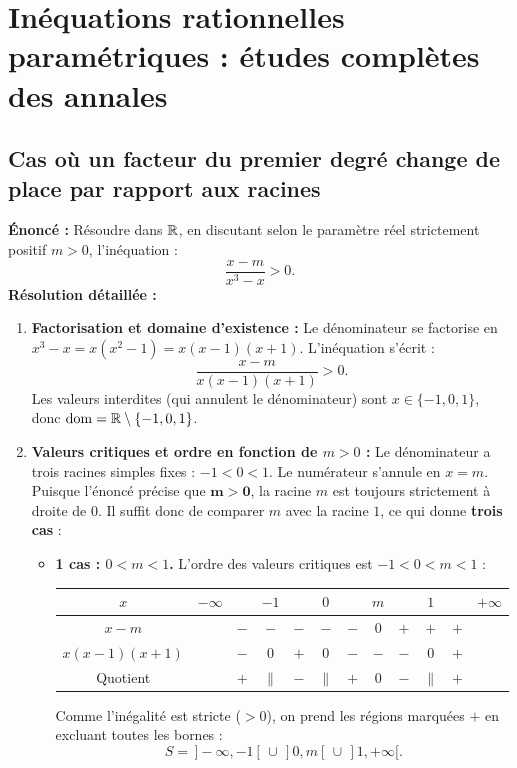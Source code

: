 \section{Inéquations rationnelles paramétriques : études complètes des annales}

\subsection{Cas où un facteur du premier degré change de place par rapport aux racines}

\begin{exemple}
\textbf{Énoncé :} Résoudre dans $\mathbb{R}$, en discutant selon le paramètre réel strictement positif $m > 0$, l'inéquation :
\[
    \frac{x - m}{x^3 - x} > 0.
\]
\textbf{Résolution détaillée :}
\begin{enumerate}
    \item \textbf{Factorisation et domaine d'existence :} Le dénominateur se factorise en $x^3 - x = x(x^2 - 1) = x(x - 1)(x + 1)$. L'inéquation s'écrit :
    \[
        \frac{x - m}{x(x - 1)(x + 1)} > 0.
    \]
    Les valeurs interdites (qui annulent le dénominateur) sont $x \in \{-1, 0, 1\}$, donc $\operatorname{dom} = \mathbb{R} \setminus \{-1, 0, 1\}$.
    \item \textbf{Valeurs critiques et ordre en fonction de $m > 0$ :}
    Le dénominateur a trois racines simples fixes : $-1 < 0 < 1$. Le numérateur s'annule en $x = m$.
    Puisque l'énoncé précise que $\mathbf{m > 0}$, la racine $m$ est toujours strictement à droite de $0$. Il suffit donc de comparer $m$ avec la racine $1$, ce qui donne \textbf{trois cas} :
    \begin{itemize}
        \item \textbf{1\ier{} cas : $0 < m < 1$.} L'ordre des valeurs critiques est $-1 < 0 < m < 1$ :
        \begin{center}
        \renewcommand{\arraystretch}{1.2}
        \begin{tabular}{c|ccccccccccc}
            $x$ & $-\infty$ & & $-1$ & & $0$ & & $m$ & & $1$ & & $+\infty$ \\ \hline
            $x - m$ & & $-$ & $-$ & $-$ & $-$ & $-$ & $0$ & $+$ & $+$ & $+$ & \\
            $x(x-1)(x+1)$ & & $-$ & $0$ & $+$ & $0$ & $-$ & $-$ & $-$ & $0$ & $+$ & \\ \hline
            Quotient & & $+$ & $\|$ & $-$ & $\|$ & $+$ & $0$ & $-$ & $\|$ & $+$ &
        \end{tabular}
        \end{center}
        Comme l'inégalité est stricte ($> 0$), on prend les régions marquées $+$ en excluant toutes les bornes :
        \[
            S = \,]-\infty, -1[ \,\cup\, ]0, m[ \,\cup\, ]1, +\infty[.
        \]


\end{itemize}
\end{enumerate}
\end{exemple}
